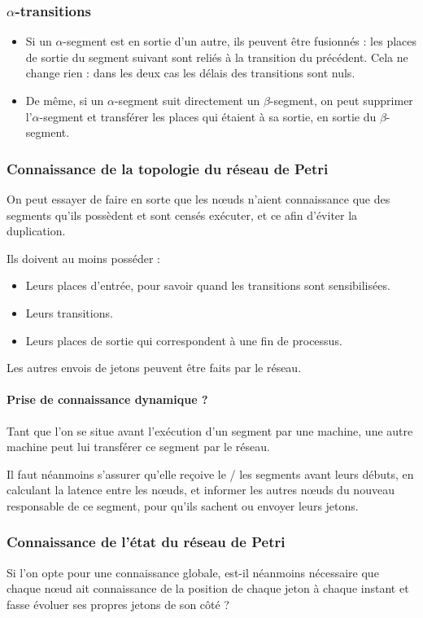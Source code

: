 \subsubsection{$\alpha$-transitions}
\begin{itemize}
\item Si un $\alpha$-segment est en sortie d'un autre, ils peuvent être fusionnés : les places de sortie du segment suivant sont reliés à la transition du précédent. Cela ne change rien : dans les deux cas les délais des transitions sont nuls.

\item De même, si un $\alpha$-segment suit directement un $\beta$-segment, on peut supprimer l'$\alpha$-segment et transférer les places qui étaient à sa sortie, en sortie du $\beta$-segment.
\end{itemize}
\subsubsection{Connaissance de la topologie du réseau de Petri}
On peut essayer de faire en sorte que les nœuds n'aient connaissance que des segments qu'ils possèdent et sont censés exécuter, et ce afin d'éviter la duplication.

Ils doivent au moins posséder : 
\begin{itemize}
\item Leurs places d'entrée, pour savoir quand les transitions sont sensibilisées.
\item Leurs transitions.
\item Leurs places de sortie qui correspondent à une fin de processus.
\end{itemize}

Les autres envois de jetons peuvent être faits par le réseau.

\paragraph{Prise de connaissance dynamique ?}
Tant que l'on se situe avant l'exécution d'un segment par une machine, une autre machine peut lui transférer ce segment par le réseau.

Il faut néanmoins s'assurer qu'elle reçoive le / les segments avant leurs débuts, en calculant la latence entre les nœuds, et informer les autres nœuds du nouveau responsable de ce segment, pour qu'ils sachent ou envoyer leurs jetons.

\subsubsection{Connaissance de l'état du réseau de Petri}
Si l'on opte pour une connaissance globale, est-il néanmoins nécessaire que chaque nœud ait connaissance de la position de chaque jeton à chaque instant et fasse évoluer ses propres jetons de son côté ? 

